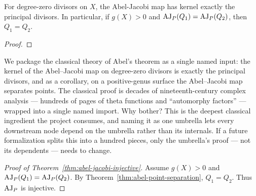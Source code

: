 \begin{theorem}
\label{input:abel-theorem}
\leanok
For degree-zero divisors on \(X\), the Abel-Jacobi map has kernel exactly the
principal divisors. In particular, if \(g(X)>0\) and
\(\operatorname{AJ}_P(Q_1)=\operatorname{AJ}_P(Q_2)\), then \(Q_1=Q_2\).
\end{theorem}
\begin{proof}\leanok\end{proof}

\begin{layman}
We package the classical theory of Abel's theorem as a single named
input: the kernel of the Abel--Jacobi map on degree-zero divisors is
exactly the principal divisors, and as a corollary, on a positive-genus
surface the Abel--Jacobi map separates points. The classical proof is
decades of nineteenth-century complex analysis --- hundreds of pages of
theta functions and ``automorphy factors'' --- wrapped into a single
named import. Why bother? This is the deepest classical ingredient the
project consumes, and naming it as one umbrella lets every downstream
node depend on the umbrella rather than its internals. If a future
formalization splits this into a hundred pieces, only the umbrella's
proof --- not its dependents --- needs to change.
\end{layman}

\begin{proof}[Proof of Theorem~\ref{thm:abel-jacobi-injective}]
Assume \(g(X)>0\) and \(\operatorname{AJ}_P(Q_1)=\operatorname{AJ}_P(Q_2)\). By
Theorem~\ref{thm:abel-point-separation}, \(Q_1=Q_2\). Thus \(\operatorname{AJ}_P\) is
injective.
\end{proof}

